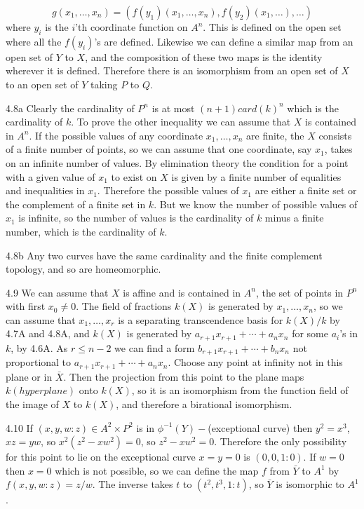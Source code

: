 $$g(x_1,\ldots, x_n)=(f(y_1)(x_1,\ldots,x_n), f(y_2)(x_1,\ldots),\ldots)$$
where $y_i$ is the $i$'th coordinate function on $A^n$. 
This is defined on the open set where all the $f(y_i)$'s are defined.
Likewise we can define a similar map from an open set of
$Y$ to $X$, and the composition of these two maps is the identity wherever
it is defined. Therefore there is an isomorphism from 
an open set of $X$ to an open set of $Y$ taking $P$ to $Q$. 
\item{4.8a} Clearly the cardinality of $P^n$ is at most
$(n+1)card(k)^n$ which is the cardinality of $k$. To prove the other
inequality we can assume that $X$ is contained in $A^n$.
If the possible values of any coordinate $x_1,\ldots ,x_n$ are finite,
the $X$ consists of a finite number of points, so we can assume that
 one coordinate, say $x_1$, takes on an infinite number of values. 
By elimination theory the condition for 
a point with a given value of $x_1$ to exist on $X$ is given
by a finite number of equalities and inequalities in $x_1$. 
Therefore the possible values of $x_1$ are either a finite set
or the complement of a finite set in $k$. But we know the number of
possible values of $x_1$ is infinite, so the number of values
is the cardinality of $k$ minus a finite number, which is the
cardinality of $k$. 
\item{4.8b} Any two curves have the same cardinality and 
the finite complement topology, and so are homeomorphic.
\item{4.9} We can assume that $X$ is affine and is contained in $A^n$,
the set of points in $P^n$ with first $x_0\ne 0$. The field of fractions
$k(X)$ is generated by $x_1,\ldots, x_n$, so we can assume that
$x_1,\ldots, x_r$ is a separating transcendence basis for $k(X)/k$
by 4.7A and 4.8A, and $k(X)$ is generated by
$a_{r+1}x_{r+1}+\cdots+a_nx_n$ for some $a_i$'s in $k$, by 4.6A. 
As $r\le n-2$ we can find a form $b_{r+1}x_{r+1}+\cdots+b_nx_n$
not proportional to $a_{r+1}x_{r+1}+\cdots+a_nx_n$. Choose any point at 
infinity not in this plane or in $\bar X$. Then the projection 
from this point to the plane maps $k(hyperplane)$ onto $k(X)$, 
so it is an isomorphism from the function field of the image of $X$ to
$k(X)$, and therefore a birational isomorphism. 
\item{4.10} If $(x,y,w:z)\in A^2\times P^2$ is in $\phi^{-1}(Y)-$(exceptional
curve) then $y^2=x^3$, $xz=yw$, so $x^2(z^2-xw^2)=0$, 
so $z^2-xw^2=0$. Therefore the only possibility for this point
to lie on the exceptional curve $x=y=0$ is $(0,0,1:0)$. 
If $w=0$ then $x=0$ which is not possible, so we can define 
the map $f$ from $\bar Y$ to $A^1$ by $f(x,y,w:z)=z/w$. The inverse
takes $t$ to $(t^2,t^3, 1:t)$, so $\bar Y$ is isomorphic to $A^1$.

\bye
